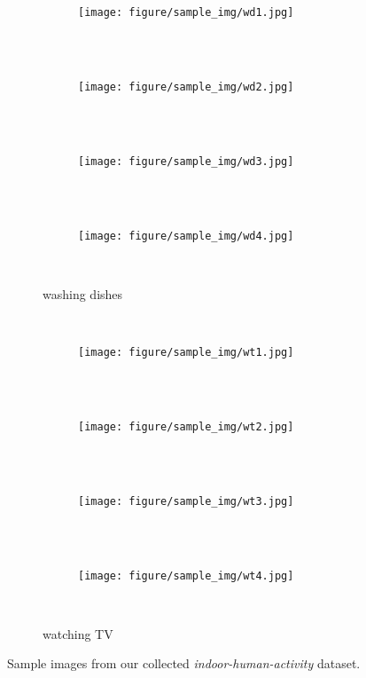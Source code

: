 \begin{figure*}[t]
\begin{subfigure}[b]{0.20\textwidth}
\begin{subfigure}[b]{0.23\textwidth}
      \centering
      \centerline{\texttt{[image: figure/sample\_img/wd1.jpg]}}
    \end{subfigure} \\
    ~\vspace{-3.0mm}\\
    \begin{subfigure}[b]{0.23\textwidth}
      \centering
      \centerline{\texttt{[image: figure/sample\_img/wd2.jpg]}}
    \end{subfigure} \\
    ~\vspace{-3.0mm}\\
    \begin{subfigure}[b]{0.23\textwidth}
      \centering
      \centerline{\texttt{[image: figure/sample\_img/wd3.jpg]}}
    \end{subfigure} \\
    ~\vspace{-3.0mm}\\
    \begin{subfigure}[b]{0.23\textwidth}
      \centering
      \centerline{\texttt{[image: figure/sample\_img/wd4.jpg]}}
    \end{subfigure} \\
    \caption{washing dishes}
  \end{subfigure}
  ~\hspace{-3mm}
  \begin{subfigure}[b]{0.20\textwidth}
    \centering
    \begin{subfigure}[b]{0.23\textwidth}
      \centering
      \centerline{\texttt{[image: figure/sample\_img/wt1.jpg]}}
    \end{subfigure} \\
    ~\vspace{-3.0mm}\\
    \begin{subfigure}[b]{0.23\textwidth}
      \centering
      \centerline{\texttt{[image: figure/sample\_img/wt2.jpg]}}
    \end{subfigure} \\
    ~\vspace{-3.0mm}\\
    \begin{subfigure}[b]{0.23\textwidth}
      \centering
      \centerline{\texttt{[image: figure/sample\_img/wt3.jpg]}}
    \end{subfigure} \\
    ~\vspace{-3.0mm}\\
    \begin{subfigure}[b]{0.23\textwidth}
      \centering
      \centerline{\texttt{[image: figure/sample\_img/wt4.jpg]}}
    \end{subfigure} \\
    \caption{watching TV}
  \end{subfigure}
  \caption{Sample images from our collected \textit{indoor-human-activity} dataset.}
  \label{fig:f5-1}
\end{figure*}